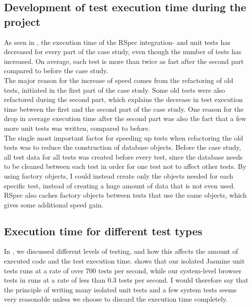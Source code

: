 
\subsection{Development of test execution time during the project}

As seen in , the execution time of the RSpec
integration- and unit tests has decreased for every part of the case
study, even though the number of tests has increased. On average, each
test is more than twice as fast after the second part compared to before
the case study.\\

The major reason for the increase of speed comes from the refactoring of
old tests, initiated in the first part of the case study. Some old tests
were also refactored during the second part, which explains the decrease
in test execution time between the first and the second part of the case
study. One reason for the drop in average execution time after the
second part was also the fact that a few more unit tests was written,
compared to before.\\

The single most important factor for speeding up tests when refactoring
the old tests was to reduce the construction of database objects. Before
the case study, all test data for all tests was created before every
test, since the database needs to be cleaned between each test in order
for one test not to affect other tests. By using factory objects, I
could instead create only the objects needed for each specific test,
instead of creating a huge amount of data that is not even used. RSpec
also caches factory objects between tests that use the same objects,
which gives some additional speed gain.\\


\subsection{Execution time for different test types}

In , we discussed different levels of testing,
and how this affects the amount of executed code and the test execution
time.  shows that our isolated Jasmine unit
tests runs at a rate of over 700 tests per second, while our system-level
browser tests in  runs at a rate of
less than 0.3 tests per second. I would therefore say that the principle
of writing many isolated unit tests and a few system tests seems
very reasonable unless we choose to discard the execution time
completely.\\

